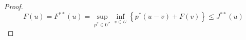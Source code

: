 \begin{theorem}
\begin{proof}
	\begin{equation}
	F(u)=F^{**}(u)=\sup_{p^* \in U^*} \inf_{v \in U} \left\lbrace p^*(u-v)+F(v)\right\rbrace \leq J^{**}(u)
	\end{equation}
	\end{proof}
\end{theorem}
